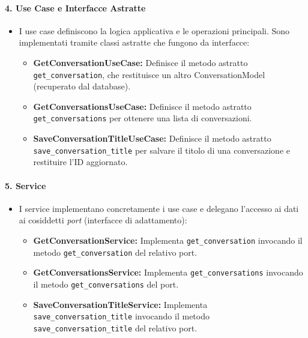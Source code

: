     \paragraph{4. Use Case e Interfacce Astratte}
    \begin{itemize}
        \item I use case definiscono la logica applicativa e le operazioni principali. Sono implementati tramite classi astratte che fungono da interfacce:
        \begin{itemize}
            \item \textbf{GetConversationUseCase:} Definisce il metodo astratto \texttt{get\_conversation}, che restituisce un altro ConversationModel (recuperato dal database).
            \item \textbf{GetConversationsUseCase:} Definisce il metodo astratto \texttt{get\_conversations} per ottenere una lista di conversazioni.
            \item \textbf{SaveConversationTitleUseCase:} Definisce il metodo astratto \texttt{save\_conversation\_title} per salvare il titolo di una conversazione e restituire l'ID aggiornato.
        \end{itemize}
    \end{itemize}

    \paragraph{5. Service}
    \begin{itemize}
        \item I service implementano concretamente i use case e delegano l'accesso ai dati ai cosiddetti \textit{port} (interfacce di adattamento):
        \begin{itemize}
            \item \textbf{GetConversationService:} Implementa \texttt{get\_conversation} invocando il metodo \texttt{get\_conversation} del relativo port.
            \item \textbf{GetConversationsService:} Implementa \texttt{get\_conversations} invocando il metodo \texttt{get\_conversations} del port.
            \item \textbf{SaveConversationTitleService:} Implementa \texttt{save\_conversation\_title} invocando il metodo \texttt{save\_conversation\_title} del relativo port.
        \end{itemize}
    \end{itemize}

